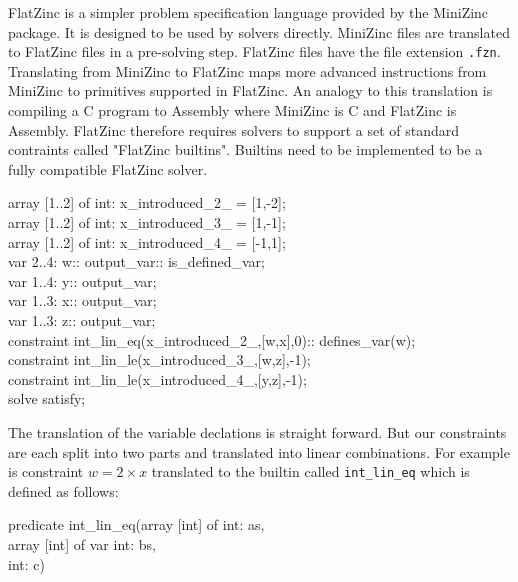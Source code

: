 FlatZinc is a simpler problem specification language provided by the MiniZinc package. It is designed to be used by solvers directly. MiniZinc files are translated to FlatZinc files in a pre-solving step. FlatZinc files have the file extension \verb|.fzn|. \\

Translating from MiniZinc to FlatZinc maps more advanced instructions from MiniZinc to primitives supported in FlatZinc. An analogy to this translation is compiling a C program to Assembly where MiniZinc is C and FlatZinc is Assembly. FlatZinc therefore requires solvers to support a set of standard contraints called "FlatZinc builtins". Builtins need to be implemented to be a fully compatible FlatZinc solver. \\

\begin{tcolorbox}[title=Simple example translated to FlatZinc]
	array [1..2] of int: x\_introduced\_2\_ = [1,-2]; \\
	array [1..2] of int: x\_introduced\_3\_ = [1,-1]; \\
	array [1..2] of int: x\_introduced\_4\_ = [-1,1]; \\
	var 2..4: w:: output\_var:: is\_defined\_var; \\
	var 1..4: y:: output\_var; \\
	var 1..3: x:: output\_var; \\
	var 1..3: z:: output\_var; \\
	constraint int\_lin\_eq(x\_introduced\_2\_,[w,x],0):: defines\_var(w); \\
	constraint int\_lin\_le(x\_introduced\_3\_,[w,z],-1); \\
	constraint int\_lin\_le(x\_introduced\_4\_,[y,z],-1); \\
	solve  satisfy;
\end{tcolorbox}

The translation of the variable declations is straight forward. But our constraints are each split into two parts and translated into linear combinations. For example is constraint $w = 2 \times x$ translated to the builtin called \verb|int_lin_eq| which is defined as follows:

\begin{tcolorbox}[title=int\_lin\_eq builtin]
	predicate int\_lin\_eq(array [int] of int: as,\\
	array [int] of var int: bs,\\
	int: c)
\end{tcolorbox}

